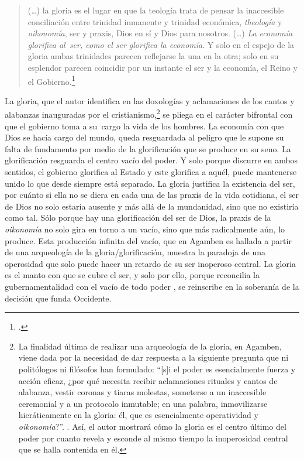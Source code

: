 \begin{quote}
(\ldots) la gloria es el lugar en que la teología trata de pensar la inaccesible conciliación entre trinidad inmanente y trinidad económica, \emph{theología} y \emph{oikonomía}, ser y praxis, Dios en sí y Dios para nosotros. (\ldots) \emph{La economía glorifica al~ser, como el ser glorifica la economía}. Y solo en el espejo de la gloria ambas trinidades parecen reflejarse la una en la otra; solo en su esplendor parecen coincidir por un instante el ser y la economía, el Reino y el Gobierno.\footcite[364--365]{@7102-AGAMBEN2008}
\end{quote}

La gloria, que el autor identifica en las doxologías y aclamaciones de los cantos y alabanzas inauguradas por el cristianismo,\footnote{La finalidad última de realizar una arqueología de la gloria, en Agamben, viene dada por la necesidad de dar respuesta a la siguiente pregunta que ni politólogos ni filósofos han formulado: \enquote{[s]i el poder es esencialmente fuerza y acción eficaz, ¿por qué necesita recibir aclamaciones rituales y cantos de alabanza, vestir coronas y tiaras molestas, someterse a un inaccesible ceremonial y a un protocolo inmutable; en una palabra, inmovilizarse hieráticamente en la gloria: él, que es esencialmente operatividad y \textit{oikonomía}?}. \cite[343]{@7102-AGAMBEN2008}. Así, el autor mostrará cómo la gloria es el centro último del poder por cuanto revela y esconde al mismo tiempo la inoperosidad central  que se halla contenida en él.} se pliega en el carácter bifrontal con que el gobierno toma a su~cargo la vida de los hombres. La economía con que Dios se hacía cargo del mundo, queda resguardada al peligro que le supone su falta de fundamento por medio de la glorificación que se produce en su seno. La glorificación resguarda el centro vacío del poder. Y solo porque discurre en ambos sentidos, el gobierno glorifica al Estado y este glorifica a aquél, puede mantenerse unido lo que desde siempre está separado. La gloria justifica la existencia del ser, por cuánto si ella no se diera en cada una de las praxis de la vida cotidiana, el ser de Dios no solo estaría ausente y más allá de la mundanidad, sino que no existiría como tal. Sólo porque hay una glorificación del ser de Dios, la praxis de la \emph{oikonomía} no solo gira en torno a un vacío, sino que más radicalmente aún, lo produce. Esta producción infinita del vacío, que en Agamben es hallada a partir de una arqueología de la gloria/glorificación, muestra la paradoja de una operosidad que solo puede hacer un retardo de su ser inoperoso central. La gloria  es el manto con que se cubre el ser, y solo por ello, porque reconcilia la gubernamentalidad con el vacío de todo poder , se reinscribe en la soberanía de la decisión que funda Occidente.

